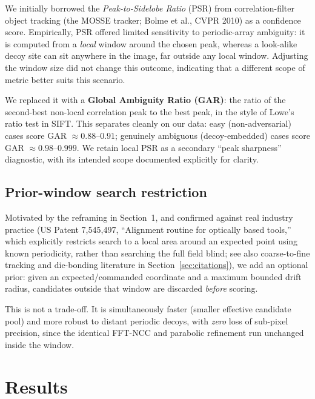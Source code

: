 \documentclass[11pt]{article}
\begin{document}
We initially borrowed the \emph{Peak-to-Sidelobe Ratio} (PSR) from
correlation-filter object tracking (the MOSSE tracker; Bolme et al.,
CVPR 2010) as a confidence score. Empirically, PSR offered limited
sensitivity to periodic-array ambiguity: it is computed from a
\emph{local} window around the chosen peak, whereas a look-alike decoy
site can sit anywhere in the image, far outside any local window.
Adjusting the window size did not change this outcome, indicating that a
different scope of metric better suits this scenario.

We replaced it with a \textbf{Global Ambiguity Ratio (GAR)}: the ratio of
the second-best non-local correlation peak to the best peak, in the style
of Lowe's ratio test in SIFT. This separates cleanly on our data: easy
(non-adversarial) cases score GAR $\approx 0.88$--$0.91$; genuinely
ambiguous (decoy-embedded) cases score GAR $\approx 0.98$--$0.999$. We
retain local PSR as a secondary ``peak sharpness'' diagnostic, with its
intended scope documented explicitly for clarity.

\subsection{Prior-window search restriction}
\label{sec:prior}

Motivated by the reframing in Section~1, and confirmed against real
industry practice (US Patent 7,545,497, ``Alignment routine for optically
based tools,'' which explicitly restricts search to a local area around
an expected point using known periodicity, rather than searching the full
field blind; see also coarse-to-fine tracking and die-bonding literature
in Section~\ref{sec:citations}), we add an optional prior: given an
expected/commanded coordinate and a maximum bounded drift radius,
candidates outside that window are discarded \emph{before} scoring.

This is not a trade-off. It is simultaneously faster (smaller effective
candidate pool) and more robust to distant periodic decoys, with
\emph{zero} loss of sub-pixel precision, since the identical FFT-NCC and
parabolic refinement run unchanged inside the window.

\section{Results}
\end{document}
